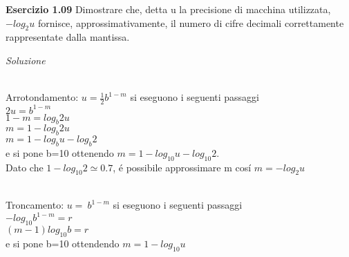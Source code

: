 \documentclass[20pt,a4paper]{book}
\begin{document}
\vspace{10mm}

\textbf{\Large{Esercizio 1.09}}
Dimostrare che, detta u la precisione di macchina utilizzata,\begin{math}-log_2 u\end{math}
fornisce, approssimativamente, il numero di cifre decimali correttamente rappresentate dalla
mantissa.

\textit{Soluzione} 

\\Arrotondamento:
\begin{math} u=\frac{1}{2}b^{1-m} \end{math} si eseguono i seguenti passaggi\\
\begin{math} 2u=b^{1-m}\end{math}\\
\begin{math} 1-m= log_b 2u\end{math}\\
\begin{math}m=1-log_b 2u\end{math}\\
\begin{math}m=1-log_b u-log_b 2\end{math}\\
e si pone b=10 ottenendo
\begin{math}m=1-log_{10} u-log_{10} 2\end{math}.\\
Dato che  \begin{math}1-log_{10} 2\simeq 0.7\end{math},  \'e possibile approssimare m cos\'i 
\begin{math}m=-log_2 u\end{math}

\vspace{2mm}

\\Troncamento:
\begin{math} u=\ b^{1-m} \end{math} si eseguono i seguenti passaggi\\
\begin{math}-log_{10}b^{1-m}=r\end{math}\\
\begin{math} (m-1)log_{10}b=r\end{math}\\
e si pone b=10 ottendendo
\begin{math} m=1-log_{10}u\end{math}\\
\end{document}
